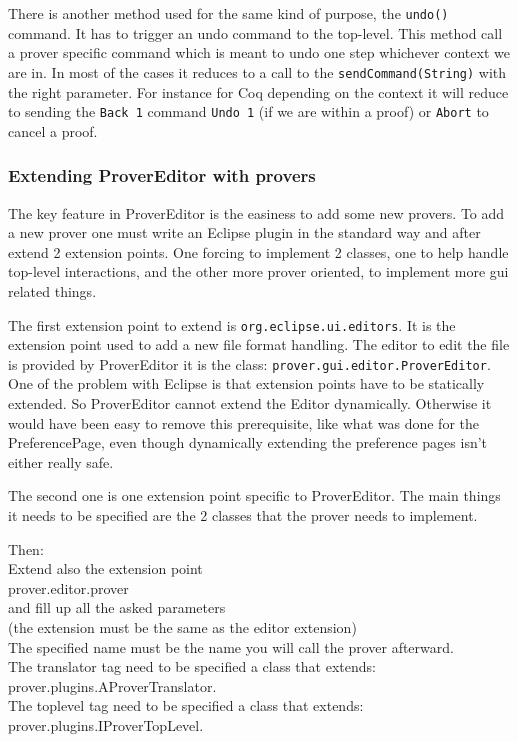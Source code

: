 \documentclass{entcs}
\begin{document}
There is another method used for the same kind of purpose, the
{\tt undo()} command. It has to trigger an undo command to the
top-level. This method call a prover specific  command
which is meant to undo one step whichever context we are in. In most of
the cases it reduces to a call to the {\tt sendCommand(String)} with the 
right parameter.
For instance for Coq depending on the context it will  reduce to 
sending the {\tt Back 1} command {\tt Undo 1}
 (if we are within a proof) or {\tt Abort}
to cancel a proof.\\

\subsubsection{Extending ProverEditor with provers}
\label{subsubsec:extend-prov-with}

The key feature in ProverEditor is the easiness to add
some new provers. To add a new prover one must write an Eclipse plugin
in the standard way and after extend 2 extension points. One forcing
to implement 2 classes, one to help handle top-level interactions, and
the other more prover oriented, to implement more gui related things.

The first extension point to extend is {\tt org.eclipse.ui.editors}.
It is the extension point used to add a new file format handling.
The editor to edit the file is provided by ProverEditor it is the class:
{\tt prover.gui.editor.ProverEditor}. One of the problem with Eclipse
is that extension points have to be statically extended. So ProverEditor
cannot extend the Editor dynamically. Otherwise it would have been easy
to remove this prerequisite, like what was done for the PreferencePage,
even though dynamically extending the preference pages isn't either 
really safe.


The second one is one extension point specific to ProverEditor.
The main things it needs to be specified are the 2 classes that the prover
needs to implement.

Then:\\
Extend also the extension point\\
prover.editor.prover\\
and fill up all the asked parameters\\
(the extension must be the same as the editor extension)\\
The specified name must be the name you will call the prover afterward.\\
The translator tag need to be specified a class that extends:\\
prover.plugins.AProverTranslator.\\
The toplevel tag need to be specified a class that extends:\\
prover.plugins.IProverTopLevel.\\
\end{document}
